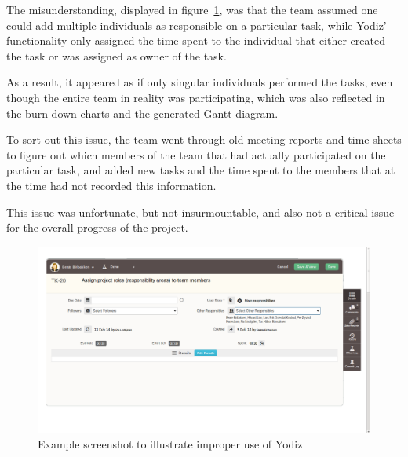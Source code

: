 The misunderstanding, displayed in figure~\ref{fig:wrongUse}, was that the team
assumed one could add multiple individuals as responsible on a particular task,
while Yodiz' functionality only assigned the time spent to the individual that
either created the task or was assigned as owner of the task.

As a result, it appeared as if only singular individuals performed the tasks,
even though the entire team in reality was participating, which was also
reflected in the burn down charts and the generated Gantt diagram. 

To sort out this issue, the team went through old meeting reports and time sheets
to figure out which members of the team that had actually participated on the
particular task, and added new tasks and the time spent to the members that at
the time had not recorded this information.%

This issue was unfortunate, but not insurmountable, and also not a critical
issue for the overall progress of the project.

\begin{figure}[H]
\includegraphics[width=\textwidth, clip, trim=1cm 2cm 4cm 1cm]{ch/retrospect/fig/wrongUse.png}
\caption{Example screenshot to illustrate improper use of Yodiz}
\label{fig:wrongUse}
\end{figure}